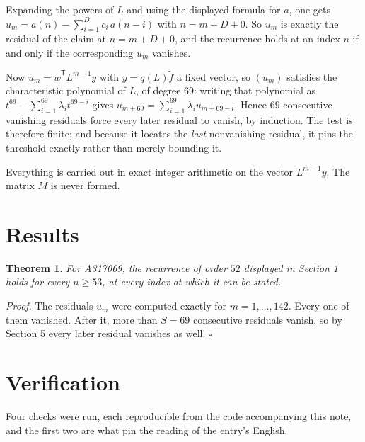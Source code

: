 \documentclass[11pt]{article}
\newtheorem{theorem}{Theorem}
\theoremstyle{definition}
\begin{document}
Expanding the powers of $L$ and using the displayed formula for $a$, one gets $u_m = a(n) - \sum_{i=1}^{D} c_i\,a(n-i)$ with $n = m + D + 0$. So $u_m$ is exactly the residual of the claim at $n = m + D + 0$, and the recurrence holds at an index $n$ if and only if the corresponding $u_m$ vanishes.

Now $u_m = \tilde w^{\mathsf T} L^{m-1} y$ with $y = q(L)\tilde f$ a fixed vector, so $(u_m)$ satisfies the characteristic polynomial of $L$, of degree $69$: writing that polynomial as $t^{69} - \sum_{i=1}^{69} \lambda_i t^{69-i}$ gives $u_{m+69} = \sum_{i=1}^{69} \lambda_i u_{m+69-i}$. Hence $69$ consecutive vanishing residuals force every later residual to vanish, by induction. The test is therefore finite; and because it locates the {\itshape last} nonvanishing residual, it pins the threshold exactly rather than merely bounding it.

Everything is carried out in exact integer arithmetic on the vector $L^{m-1}y$. The matrix $M$ is never formed.

\section{Results}

\begin{theorem} For A317069, the recurrence of order $52$ displayed in Section 1 holds for every $n \ge 53$, at every index at which it can be stated.\end{theorem}

{\itshape Proof.} The residuals $u_m$ were computed exactly for $m = 1,\dots,142$. Every one of them vanished. After it, more than $S = 69$ consecutive residuals vanish, so by Section 5 every later residual vanishes as well. $\square$

\section{Verification}

Four checks were run, each reproducible from the code accompanying this note, and the first two are what pin the reading of the entry's English.
\end{document}
